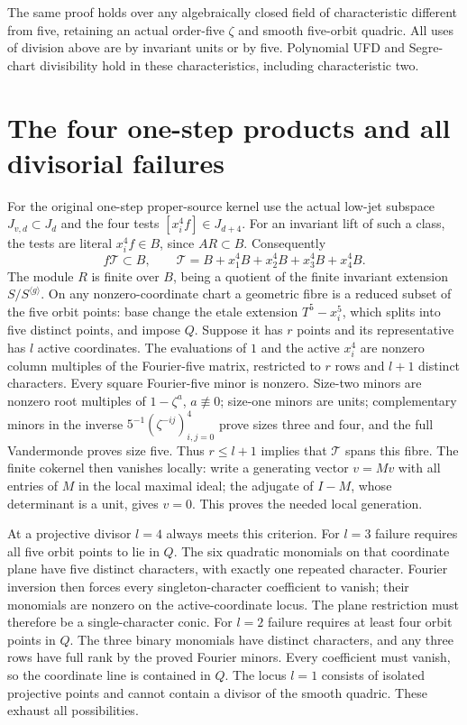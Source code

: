 \documentclass[11pt]{article}
\begin{document}
The same proof holds over any algebraically closed field of
characteristic different from five, retaining an actual order-five
$\zeta$ and smooth five-orbit quadric. All uses of division above
are by invariant units or by five. Polynomial UFD and Segre-chart
divisibility hold in these characteristics, including characteristic two.

\section{The four one-step products and all divisorial failures}
For the original one-step proper-source kernel use the actual low-jet
subspace $J_{v,d}\subset J_d$ and the four tests $[x_i^4f]\in J_{d+4}$.
For an invariant lift of such a class, the tests are literal
$x_i^4f\in B$, since $AR\subset B$. Consequently
\[
 f\mathcal T\subset B,\qquad
 \mathcal T=B+x_1^4B+x_2^4B+x_3^4B+x_4^4B.                         \tag{CP5}
\]
The module $R$ is finite over $B$, being a quotient of the finite
invariant extension $S/S^{\langle g\rangle}$. On any nonzero-coordinate
chart a geometric fibre is a reduced subset of the five orbit points:
base change the etale extension $T^5-x_i^5$, which splits into
five distinct points, and impose $Q$. Suppose it has $r$ points
and its representative has $l$ active coordinates. The evaluations
of $1$ and the active $x_i^4$ are nonzero column multiples of the
Fourier-five matrix, restricted to $r$ rows and $l+1$ distinct
characters. Every square Fourier-five minor is nonzero. Size-two
minors are nonzero root multiples of $1-\zeta^a$, $a\not\equiv0$;
size-one minors are units; complementary minors in the inverse
$5^{-1}(\zeta^{-ij})_{i,j=0}^4$ prove sizes three and four, and the full
Vandermonde proves size five. Thus $r\le l+1$ implies that
$\mathcal T$ spans this fibre. The finite cokernel then vanishes
locally: write a generating vector $v=Mv$ with all entries of $M$
in the local maximal ideal; the adjugate of $I-M$, whose determinant
is a unit, gives $v=0$. This proves the needed local generation.

At a projective divisor $l=4$ always meets this criterion. For
$l=3$ failure requires all five orbit points to lie in $Q$. The
six quadratic monomials on that coordinate plane have five distinct
characters, with exactly one repeated character. Fourier inversion
then forces every singleton-character coefficient to vanish; their
monomials are nonzero on the active-coordinate locus. The plane
restriction must therefore be a single-character conic. For $l=2$
failure requires at least four orbit points in $Q$. The three binary
monomials have distinct characters, and any three rows have full
rank by the proved Fourier minors. Every coefficient must vanish,
so the coordinate line is contained in $Q$. The locus $l=1$ consists
of isolated projective points and cannot contain a divisor of the
smooth quadric. These exhaust all possibilities.
\end{document}
